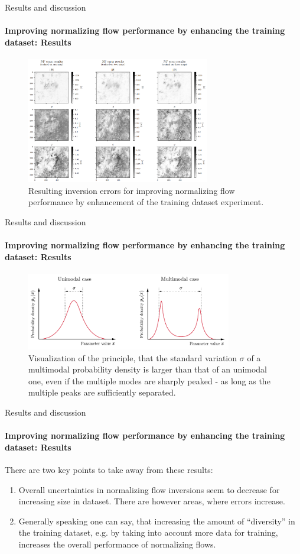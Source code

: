 \documentclass{beamer}
\begin{document}
\begin{frame}[allowframebreaks]{Results and discussion}
	\framesubtitle{Improving normalizing flow performance by enhancing the training dataset: Results} %
\begin{figure}[h!]
	\centering
	\includegraphics[width=8cm]{figures/presentation/exp5_fig2.png}
	\caption{Resulting inversion errors for improving normalizing flow performance by enhancement of the training dataset experiment.}
	\label{fig:exp5_fig2}
\end{figure}
\end{frame}

\begin{frame}[allowframebreaks]{Results and discussion}
	\framesubtitle{Improving normalizing flow performance by enhancing the training dataset: Results} %
\begin{figure}[h!] %
	\centering
	\includegraphics[width=0.8\textwidth]{figures/thesis/unimodal_multimodal.pdf}
	\caption{Visualization of the principle, that the standard variation $\sigma$ of a multimodal probability density is larger than that of an unimodal one, even if the multiple modes are sharply peaked - as long as the multiple peaks are sufficiently separated.}
	\label{fig:unimodal_multimodal}
\end{figure}
\end{frame}

\begin{frame}[allowframebreaks]{Results and discussion}
	\framesubtitle{Improving normalizing flow performance by enhancing the training dataset: Results} %
There are two key points to take away from these results:
\begin{enumerate}
	\item Overall uncertainties in normalizing flow inversions seem to decrease for increasing size in dataset. There are however areas, where errors increase.
	\item Generally speaking one can say, that increasing the amount of ``diversity'' in the training dataset, e.g. by taking into account more data for training, increases the overall performance of normalizing flows.
\end{enumerate}
\end{frame}
\end{document}
